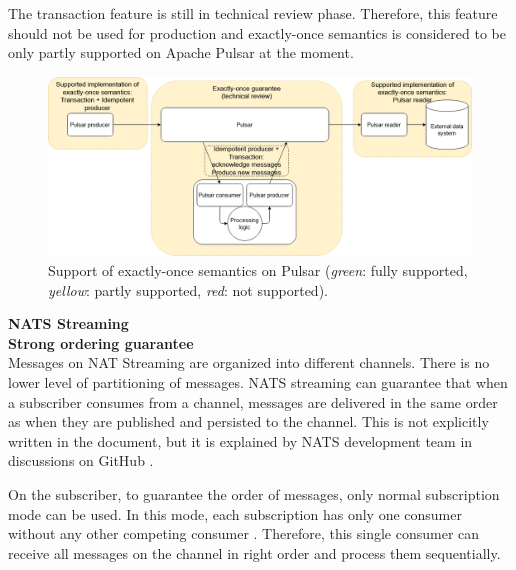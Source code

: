 The transaction feature is still in technical review phase. Therefore, this feature should not be used for production and exactly-once semantics is considered to be only partly supported on Apache Pulsar at the moment.


\begin{figure}[h]
	\centering
	\includegraphics[width=\linewidth]{images/exactly-once-pulsar.png}
	\caption{Support of exactly-once semantics on Pulsar (\emph{green}: fully supported, \emph{yellow}: partly supported, \emph{red}: not supported).}
	\label{fig:exactlyoncepulsar}
\end{figure}




\large \textbf{NATS Streaming}\\
\normalsize
\textbf{Strong ordering guarantee}\\
Messages on NAT Streaming are organized into different channels. There is no lower level of partitioning of messages. NATS streaming can guarantee that when a subscriber consumes from a channel, messages are delivered in the same order as when they are published and persisted to the channel. This is not explicitly written in the document, but it is explained by NATS development team in discussions on GitHub \cite{natsorder}.

On the subscriber, to guarantee the order of messages, only normal subscription mode can be used. In this mode, each subscription has only one consumer without any other competing consumer \cite{natsconceptchannels}. Therefore, this single consumer can receive all messages on the channel in right order and process them sequentially.

